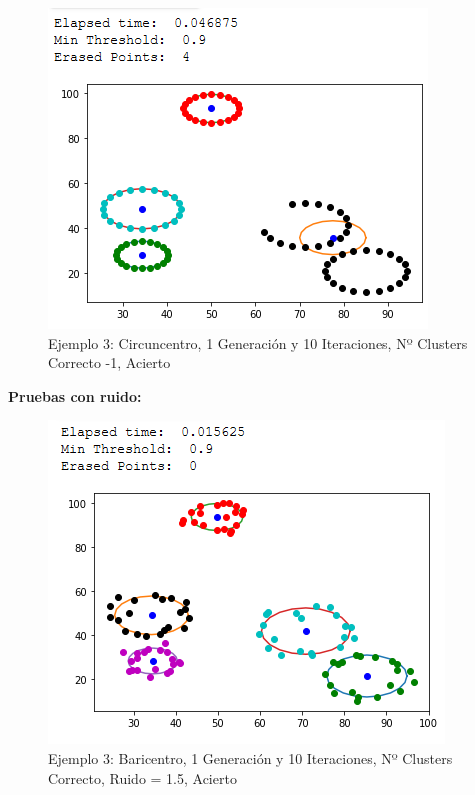 \documentclass[conference,a4paper]{IEEEtran}
\begin{document}
\begin{figure}[H]
\centering
\includegraphics[scale=0.65]{Experimentacion/Ejemplo3/ej3_c_1_10_lc}
\caption{Ejemplo 3: Circuncentro, 1 Generación y 10 Iteraciones,  Nº Clusters Correcto -1, Acierto\\}
\end{figure}

\textbf{Pruebas con ruido:}\\

\begin{figure}[H]
\centering
\includegraphics[scale=0.65]{Experimentacion/Ejemplo3/ej3_b_1_10_mr}
\caption{Ejemplo 3: Baricentro, 1 Generación y 10 Iteraciones,  Nº Clusters Correcto, Ruido = 1.5, Acierto\\}
\end{figure}
\end{document}
